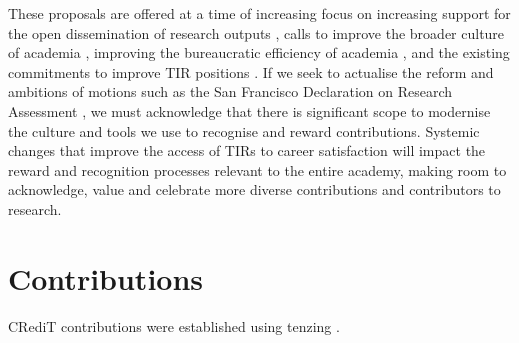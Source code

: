 \documentclass[authordate,meta]{jote-new-article}
\begin{document}
These proposals are offered at a time of increasing focus on increasing support for the open dissemination of research outputs \parencites{Concordatgroup_concordat_2016}{Nelson2022}{Unesco2021}, calls to improve the broader culture of academia \parencites{Coara2022}{WellcomeTrust2020}, improving the bureaucratic efficiency of academia \parencites{IndependentReviewofResearchBureaucracy2022}, and the existing commitments to improve TIR positions \parencites{NCRIS2022}{TechnicianCommitment2020}. If we seek to actualise the reform and ambitions of motions such as the San Francisco Declaration on Research Assessment \parencites{Dora2012}, we must acknowledge that there is significant scope to modernise the culture and tools we use to recognise and reward contributions. Systemic changes that improve the access of TIRs to career satisfaction will impact the reward and recognition processes relevant to the entire academy, making room to acknowledge, value and celebrate more diverse contributions and contributors to research.





\section{Contributions}
CRediT contributions were established using tenzing \parencites{Holcombe_2020}.
\end{document}
